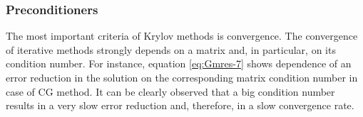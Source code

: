 










\subsubsection{Preconditioners}
\label{subseq:iterative-preconditioners}
The most important criteria of Krylov methods is convergence. The convergence of iterative methods strongly depends on a matrix and, in particular, on its condition number. For instance, equation \ref{eq:Gmres-7} shows dependence of an error reduction in the solution on the corresponding matrix condition number in case of CG method. It can be clearly observed that a big condition number results in a very slow error reduction and, therefore, in a slow convergence rate.\\

